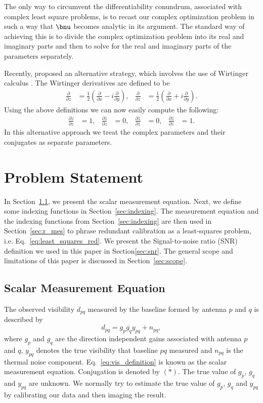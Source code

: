 \documentclass[useAMS,usenatbib]{mn2e}
\newcommand{\conj}[1]{\overline{#1}}
\begin{document}
The only way to circumvent the differentiability conundrum, associated with complex least square problems, is to recast our complex optimization problem in such a way that $\bnu$ becomes analytic in its argument.
The standard way of achieving this is to divide the complex optimization problem into its real and imaginary parts and then to solve for the real and imaginary parts of the parameters separately.

Recently, \citet{Sorber2012} proposed an alternative strategy, which involves the use of Wirtinger calculus \citep{Wirtinger1927}. The Wirtinger derivatives 
are defined to be 
\begin{align}
\label{eq:wir}
\frac{\partial}{\partial z} &= \frac{1}{2}\left ( \frac{\partial}{\partial x} -  i \frac{\partial}{\partial y} \right ),&\frac{\partial}{\partial \conj{z}} &= \frac{1}{2}\left ( \frac{\partial}{\partial x} +  i \frac{\partial}{\partial y} \right ). 
\end{align}
Using the above definitions we can now easily compute the following:
\begin{align}
\frac{\partial z}{\partial z} & = 1, & \frac{\partial \conj{z}}{\partial z}&=0, & \frac{\partial z}{\partial \conj{z}} & = 0, & \frac{\partial \conj{z}}{\partial \conj{z}}&=1.
\end{align}
In this alternative approach we treat the complex parameters and their conjugates as separate parameters.

\section{Problem Statement}
In Section~\ref{sec:s_mes}, we present the scalar measurement equation. Next, we define some indexing functions in Section~\ref{sec:indexing}. The measurement 
equation and the indexing functions from Section~\ref{sec:indexing} are then used in Section~\ref{sec:r_mes} to phrase redundant calibration as a least-squares problem, i.e. Eq.~\eqref{eq:least_squares_red}.
We present the Signal-to-noise ratio (SNR) definition we used in this paper in Section\ref{sec:snr}. The general scope and limitations of this paper is discussed in Section~\ref{sec:scope}.

\subsection{Scalar Measurement Equation}
\label{sec:s_mes}
The observed visibility $d_{pq}$ measured by the baseline formed by antenna $p$ and $q$ is described by
\begin{equation}
\label{eq:vis_definition}
d_{pq} = g_{p}\conj{g_q}y_{pq} + n_{pq},
\end{equation}
where $g_{p}$ and $g_{q}$ are the direction independent gains associated with antenna $p$ and $q$, $y_{pq}$ denotes the true visibility that baseline $pq$ measured
and $n_{pq}$ is the thermal noise component. Eq.~\eqref{eq:vis_definition} is known as the scalar measurement equation. Conjugation is denoted by $\conj{(*)}$. The true value of $g_p$, $g_q$ and $y_{pq}$ are unknown. We normally try to estimate the true value of
$g_p$, $g_q$ and $y_{pq}$ by calibrating our data and then imaging the result.
\end{document}
